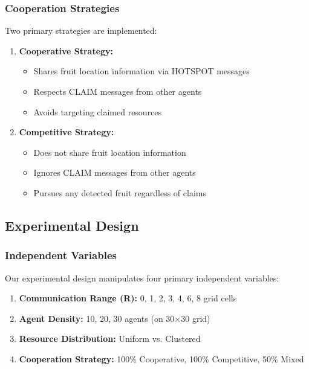 \documentclass[12pt,a4paper]{article}
\begin{document}
\subsubsection{Cooperation Strategies}

Two primary strategies are implemented:

\begin{enumerate}
    \item \textbf{Cooperative Strategy:}
    \begin{itemize}
        \item Shares fruit location information via HOTSPOT messages
        \item Respects CLAIM messages from other agents
        \item Avoids targeting claimed resources
    \end{itemize}

    \item \textbf{Competitive Strategy:}
    \begin{itemize}
        \item Does not share fruit location information
        \item Ignores CLAIM messages from other agents
        \item Pursues any detected fruit regardless of claims
    \end{itemize}
\end{enumerate}

\subsection{Experimental Design}

\subsubsection{Independent Variables}

Our experimental design manipulates four primary independent variables:

\begin{enumerate}
    \item \textbf{Communication Range (R):} 0, 1, 2, 3, 4, 6, 8 grid cells
    \item \textbf{Agent Density:} 10, 20, 30 agents (on 30×30 grid)
    \item \textbf{Resource Distribution:} Uniform vs. Clustered
    \item \textbf{Cooperation Strategy:} 100\% Cooperative, 100\% Competitive, 50\% Mixed
\end{enumerate}
\end{document}
